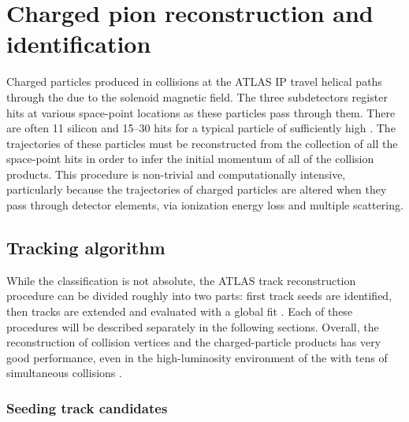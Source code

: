 \chapter{Charged pion reconstruction and identification}
\label{ch:reconstruction}
\graphicspath{{Chapter-Reconstruction/figures/}}

Charged particles produced in collisions at the ATLAS \ac{IP} travel helical paths through the \id due to the solenoid magnetic field.
The three subdetectors register hits at various space-point locations as these particles pass through them.
There are often 11 silicon and 15--30 \trt hits for a typical particle of sufficiently high \pt.
The trajectories of these particles must be reconstructed from the collection of all the space-point hits in order to infer the initial momentum of all of the collision products.
This procedure is non-trivial and computationally intensive, particularly because the trajectories of charged particles are altered when they pass through detector elements, via ionization energy loss and multiple scattering.

\section{Tracking algorithm}



While the classification is not absolute, the ATLAS track reconstruction procedure can be divided roughly into two parts: first track seeds are identified, then tracks are extended and evaluated with a global fit \cite{Cornelissen:2007vba}. %
Each of these procedures will be described separately in the following sections.
Overall, the reconstruction of collision vertices and the charged-particle products has very good performance, even in the high-luminosity environment of the \lhc with tens of simultaneous collisions \cite{ATLAS:2012jma}. %

\subsection{Seeding track candidates}

